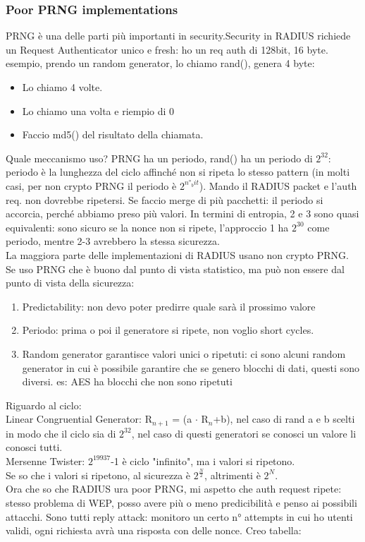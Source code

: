 \documentclass[16px]{article}
\begin{document}
\subsubsection{Poor PRNG implementations}
PRNG è una delle parti più importanti in security.Security in RADIUS richiede un Request Authenticator unico e fresh: ho un req auth di 128bit, 16 byte.\\ esempio, prendo un random generator, lo chiamo rand(), genera 4 byte:
\begin{itemize}
\item Lo chiamo 4 volte.
\item Lo chiamo una volta e riempio di 0
\item Faccio md5() del risultato della chiamata.
\end{itemize}
Quale meccanismo uso? PRNG ha un periodo, rand() ha un periodo di $2^{32}$: periodo è la lunghezza del ciclo affinché non si ripeta lo stesso pattern (in molti casi, per non crypto PRNG il periodo è $2^{n°_bit}$). Mando il RADIUS packet e l'auth req. non dovrebbe ripetersi. Se faccio merge di più pacchetti: il periodo si accorcia, perché abbiamo preso più valori. In termini di entropia, 2 e 3 sono quasi equivalenti: sono sicuro se la nonce non si ripete, l'approccio 1 ha $2^{30}$ come periodo, mentre 2-3 avrebbero la stessa sicurezza.\\ La maggiora parte delle implementazioni di RADIUS usano non crypto PRNG. Se uso PRNG che è buono dal punto di vista statistico, ma può non essere dal punto di vista della sicurezza:
\begin{enumerate}
\item Predictability: non devo poter predirre quale sarà il prossimo valore 
\item Periodo: prima o poi il generatore si ripete, non voglio short cycles.
\item Random generator garantisce valori unici o ripetuti: ci sono alcuni random generator in cui è possibile garantire che se genero blocchi di dati, questi sono diversi. es: AES ha blocchi che non sono ripetuti
\end{enumerate}
Riguardo al ciclo:\\
Linear Congruential Generator: R$_{n+1}$ = (a $\cdot$ R$_{n}$+b), nel caso di rand a e b scelti in modo che il ciclo sia di $2^{32}$, nel caso di questi generatori se conosci un valore li conosci tutti.\\ Mersenne Twister: $2^{19937}$-1 è ciclo "infinito", ma i valori si ripetono.\\ Se so che i valori si ripetono, al sicurezza è $2^{\frac{N}{2}}$, altrimenti è $2^N$.\\ Ora che so che RADIUS ura poor PRNG, mi aspetto che auth request ripete: stesso problema di WEP, posso avere più o meno predicibilità e penso ai possibili attacchi. Sono tutti reply attack: monitoro un certo n° attempts in cui ho utenti validi, ogni richiesta avrà una risposta con delle nonce. Creo tabella:
\end{document}
